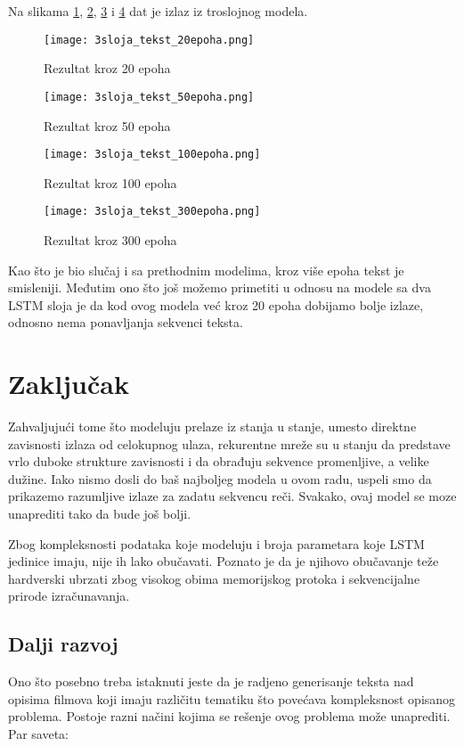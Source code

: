 \documentclass[a4paper]{article}
\begin{document}
Na slikama \ref{fig:tekst_20}, \ref{fig:tekst_50}, \ref{fig:tekst_100} i \ref{fig:tekst_300} dat je izlaz iz troslojnog modela.

\begin{figure}[!h]
    \centering
    \texttt{[image: 3sloja\_tekst\_20epoha.png]}
    \caption{Rezultat kroz 20 epoha}
    \label{fig:tekst_20}
\end{figure}
\begin{figure}[!h]
    \centering
    \texttt{[image: 3sloja\_tekst\_50epoha.png]}
    \caption{Rezultat kroz 50 epoha}
    \label{fig:tekst_50}
\end{figure}
\begin{figure}[!h]
    \centering
    \texttt{[image: 3sloja\_tekst\_100epoha.png]}
    \caption{Rezultat kroz 100 epoha}
    \label{fig:tekst_100}
\end{figure}
\begin{figure}[!h]
    \centering
    \texttt{[image: 3sloja\_tekst\_300epoha.png]}
    \caption{Rezultat kroz 300 epoha}
    \label{fig:tekst_300}
\end{figure}

Kao što je bio slučaj i sa prethodnim modelima, kroz više epoha tekst je smisleniji. Međutim ono što još možemo primetiti u odnosu na modele sa dva LSTM sloja je da kod ovog modela već kroz 20 epoha dobijamo bolje izlaze, odnosno nema ponavljanja sekvenci teksta. 

\section{Zaključak}

Zahvaljujući tome što modeluju prelaze iz stanja u stanje, umesto direktne zavisnosti izlaza od celokupnog ulaza, rekurentne mreže su u stanju da predstave vrlo duboke strukture zavisnosti i da obrađuju sekvence promenljive, a velike dužine. Iako nismo dosli do baš najboljeg modela u ovom radu, uspeli smo da prikazemo razumljive izlaze za zadatu sekvencu reči. Svakako, ovaj model se moze unaprediti tako da bude još bolji.

Zbog kompleksnosti podataka koje modeluju i broja parametara koje LSTM jedinice imaju, nije ih lako obučavati. Poznato je da je njihovo obučavanje teže hardverski ubrzati zbog visokog obima memorijskog protoka i sekvencijalne prirode izračunavanja.

\subsection{Dalji razvoj}
Ono što posebno treba istaknuti jeste da je radjeno
generisanje teksta nad opisima filmova koji imaju različitu tematiku što povećava kompleksnost opisanog problema.
Postoje razni načini kojima se rešenje ovog problema može unaprediti. Par saveta:  
\end{document}
